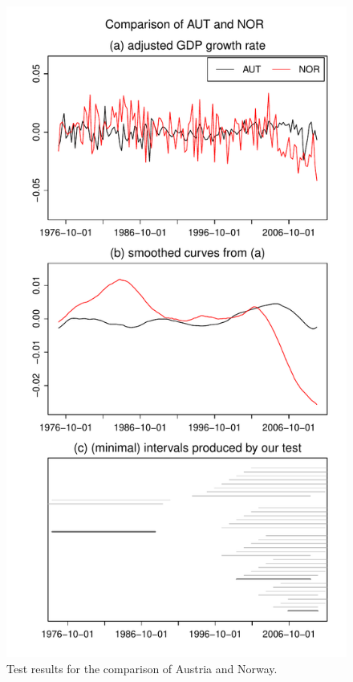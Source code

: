 \documentclass[12pt]{article}
\begin{document}
\begin{figure}
\hspace{0.1cm}
\begin{minipage}[t]{0.24\textwidth}
\includegraphics[width=\textwidth]{output/plots/gdp/AUT_vs_NOR}
\caption{Test results for the comparison of Austria and Norway.}\label{fig:Austria:Norway}
\end{minipage}
\hspace{0.1cm}

\end{figure}
\end{document}

